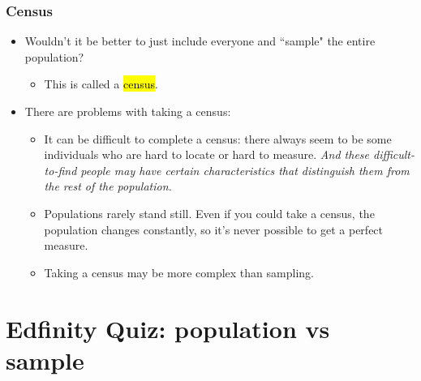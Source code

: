 \documentclass[slidestop,compress,mathserif]{beamer}
\begin{document}
\begin{frame}
	\frametitle{Census}

	\begin{itemize}

	\item Wouldn't it be better to just include everyone and ``sample" the entire population? 

	\begin{itemize}
	\item This is called a \hl{census}.
	\end{itemize}

	\pause

	\item There are problems with taking a census:

	\begin{itemize}
	\item It can be difficult to complete a census: there always seem to be some individuals who are hard to locate or hard to measure. \textit{And these difficult-to-find people may have certain characteristics that distinguish them from the rest of the population.}
	\item Populations rarely stand still. Even if you could take a census, the population changes constantly, so it's never possible to get a perfect measure.
	\item Taking a census may be more complex than sampling.
	\end{itemize}

	\end{itemize}

\end{frame}

\section{Edfinity Quiz: population vs sample}
\end{document}

